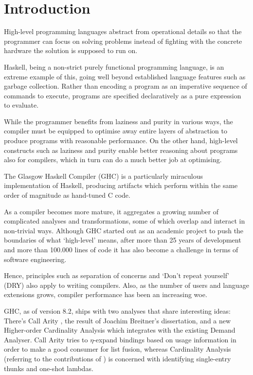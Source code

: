 \chapter{Introduction}\label{sec:intro}

High-level programming languages abstract from operational details so that the programmer can focus on solving problems instead of fighting with the concrete hardware the solution is supposed to run on.

Haskell, being a non-strict purely functional programming language, is an extreme example of this, going well beyond established language features such as garbage collection.
Rather than encoding a program as an imperative sequence of commands to execute, programs are specified declaratively as a pure expression to evaluate.

While the programmer benefits from laziness and purity in various ways, the compiler must be equipped to optimise away entire layers of abstraction to produce programs with reasonable performance.
On the other hand, high-level constructs such as laziness and purity enable better reasoning about programs also for compilers, which in turn can do a much better job at optimising.

The Glasgow Haskell Compiler (GHC) is a particularly miraculous implementation of Haskell, producing artifacts which perform within the same order of magnitude as hand-tuned C code.

As a compiler becomes more mature, it aggregates a growing number of complicated analyses and transformations, some of which overlap and interact in non-trivial ways.
Although GHC started out as an academic project to push the boundaries of what `high-level' means, after more than 25 years of development and more than 100.000 lines of code it has also become a challenge in terms of software engineering.

Hence, principles such as separation of concerns and `Don't repeat yourself' (DRY) also apply to writing compilers.
Also, as the number of users and language extensions grows, compiler performance has been an increasing woe.

GHC, as of version 8.2, ships with two analyses that share interesting ideas: 
There's Call Arity \parencite{callarity}, the result of Joachim Breitner's dissertation, and a new Higher-order Cardinality Analysis \parencite{card} which integrates with the existing Demand Analyser.
Call Arity tries to $\eta$-expand bindings based on usage information in order to make  a good consumer for list fusion, whereas Cardinality Analysis (referring to the contributions of \textcite{card}) is concerned with identifying single-entry thunks and one-shot lambdas.

